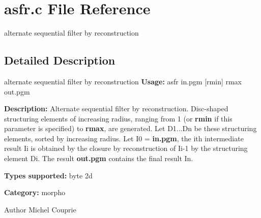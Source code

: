 \section{asfr.c File Reference}
\label{asfr_8c}


alternate sequential filter by reconstruction  




\subsection{Detailed Description}
alternate sequential filter by reconstruction {\bfseries Usage:} asfr in.pgm [rmin] rmax out.pgm

{\bfseries Description:} Alternate sequential filter by reconstruction. Disc-\/shaped structuring elements of increasing radius, ranging from 1 (or {\bfseries rmin} if this parameter is specified) to {\bfseries rmax}, are generated. Let D1...Dn be these structuring elements, sorted by increasing radius. Let I0 = {\bfseries in.pgm}, the ith intermediate result Ii is obtained by the closure by reconstruction of Ii-\/1 by the structuring element Di. The result {\bfseries out.pgm} contains the final result In.

{\bfseries Types supported:} byte 2d

{\bfseries Category:} morpho

\begin{DoxyAuthor}{Author}
Michel Couprie 
\end{DoxyAuthor}
